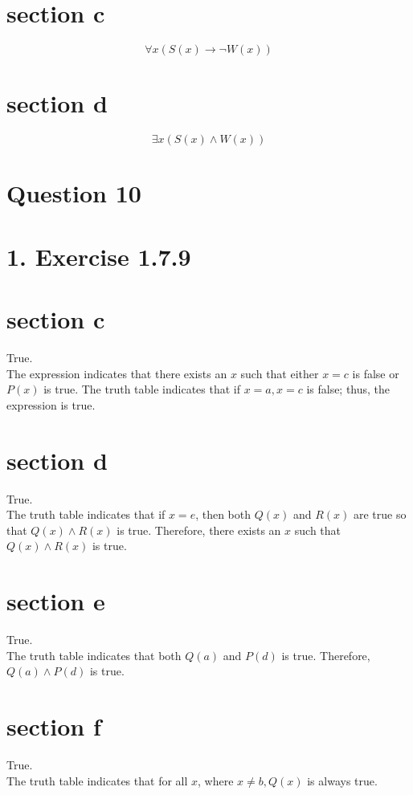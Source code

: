 \documentclass[10pt]{article}
\begin{document}
\section*{section c}

$$
\forall x(S(x) \rightarrow \neg W(x))
$$

\section*{section d}

$$
\exists x(S(x) \wedge W(x))
$$

\pagebreak
\section*{Question 10}
\section*{1. Exercise 1.7.9}
\section*{section c}
True.\\
The expression indicates that there exists an $x$ such that either $x=c$ is false or $P(x)$ is true. The truth table indicates that if $x=a, x=c$ is false; thus, the expression is true.

\section*{section d}
True.\\
The truth table indicates that if $x=e$, then both $Q(x)$ and $R(x)$ are true so that $Q(x) \wedge R(x)$ is true. Therefore, there exists an $x$ such that $Q(x) \wedge R(x)$ is true.

\section*{section e}
True.\\
The truth table indicates that both $Q(a)$ and $P(d)$ is true. Therefore, $Q(a) \wedge P(d)$ is true.

\section*{section f}
True.\\
The truth table indicates that for all $x$, where $x \neq b, Q(x)$ is always true.
\end{document}
